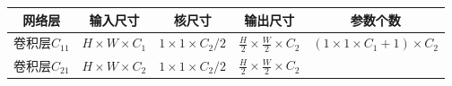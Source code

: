 \documentclass[12pt,a4paper,UTF8,twoside]{book}
\begin{document}
\begin{longtable}[]{@{}ccccc@{}}
\toprule
\begin{minipage}[b]{0.17\columnwidth}\centering
网络层\strut
\end{minipage} & \begin{minipage}[b]{0.17\columnwidth}\centering
输入尺寸\strut
\end{minipage} & \begin{minipage}[b]{0.17\columnwidth}\centering
核尺寸\strut
\end{minipage} & \begin{minipage}[b]{0.17\columnwidth}\centering
输出尺寸\strut
\end{minipage} & \begin{minipage}[b]{0.17\columnwidth}\centering
参数个数\strut
\end{minipage}\tabularnewline
\midrule
\endhead
\begin{minipage}[t]{0.17\columnwidth}\centering
卷积层\(C_{11}\)\strut
\end{minipage} & \begin{minipage}[t]{0.17\columnwidth}\centering
\(H\times{W}\times{C_1}\)\strut
\end{minipage} & \begin{minipage}[t]{0.17\columnwidth}\centering
\(1\times1\times{C_2}/2\)\strut
\end{minipage} & \begin{minipage}[t]{0.17\columnwidth}\centering
\(\frac{H}{2}\times\frac{W}{2}\times{C_2}\)\strut
\end{minipage} & \begin{minipage}[t]{0.17\columnwidth}\centering
\((1\times1\times{C_1}+1)\times{C_2}\)\strut
\end{minipage}\tabularnewline
\begin{minipage}[t]{0.17\columnwidth}\centering
卷积层\(C_{21}\)\strut
\end{minipage} & \begin{minipage}[t]{0.17\columnwidth}\centering
\(H\times{W}\times{C_2}\)\strut
\end{minipage} & \begin{minipage}[t]{0.17\columnwidth}\centering
\(1\times1\times{C_2}/2\)\strut
\end{minipage} & \begin{minipage}[t]{0.17\columnwidth}\centering
\(\frac{H}{2}\times\frac{W}{2}\times{C_2}\)\strut
\end{minipage} & \begin{minipage}[t]{0.17\columnwidth}\centering

\end{minipage}
\end{longtable}
\end{document}
